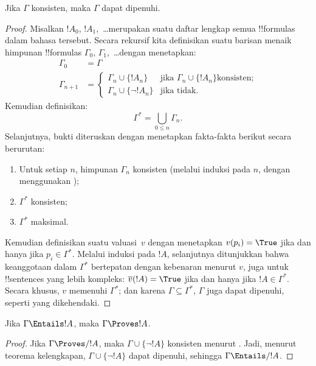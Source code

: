 \documentclass[../../../include/open-logic-section]{subfiles}
\begin{document}
\begin{thm}[Kelengkapan]
Jika $\Gamma$ konsisten, maka $\Gamma$ dapat dipenuhi.
\end{thm}

\begin{proof}
Misalkan $!A_0$, $!A_1$,~\dots merupakan suatu daftar lengkap semua
!!{formula}s dalam bahasa tersebut. Secara rekursif kita definisikan suatu
barisan menaik himpunan !!{formula}s $\Gamma_0$, $\Gamma_1$,~\dots dengan
menetapkan:
\begin{align*}
\Gamma_0 & = \Gamma\\
\Gamma_{n+1} &  =
\begin{cases}
  \Gamma_n \cup \{!A_n\} & \text{jika $\Gamma_n \cup \{!A_n\}$
    konsisten;}\\
  \Gamma_n \cup \{\lnot !A_n\} & \text{jika tidak}.
\end{cases}
\end{align*}
Kemudian definisikan:
\[
\Gamma^* = \bigcup_{0\le n}\Gamma_n.
\]
Selanjutnya, bukti diteruskan dengan menetapkan fakta-fakta berikut secara
berurutan:
\begin{enumerate}
\item Untuk setiap $n$, himpunan $\Gamma_n$ konsisten (melalui induksi pada
  $n$, dengan menggunakan );
\item $\Gamma^*$ konsisten;
\item $\Gamma^*$ maksimal.
\end{enumerate}
Kemudian definisikan suatu valuasi~$v$ dengan menetapkan $v(p_i) = \True$ jika
dan hanya jika $p_i \in \Gamma^*$. Melalui induksi pada $!A$, selanjutnya
ditunjukkan bahwa keanggotaan dalam $\Gamma^*$ bertepatan dengan kebenaran
menurut $v$, juga untuk !!{sentence}s yang lebih kompleks:
$\overline{v}(!A) = \True$ jika dan hanya jika $!A \in \Gamma^*$. Secara
khusus, $v$ memenuhi $\Gamma^*$; dan karena $\Gamma \subseteq \Gamma^*$,
$\Gamma$ juga dapat dipenuhi, seperti yang dikehendaki.
\end{proof}

\begin{cor}
Jika $\Gamma \Entails !A$, maka $\Gamma \Proves !A$.
\end{cor}

\begin{proof}
Jika $\Gamma\Proves/ !A$, maka $\Gamma \cup \{\lnot !A\}$ konsisten menurut
. Jadi, menurut teorema kelengkapan,
$\Gamma \cup \{\lnot !A\}$ dapat dipenuhi, sehingga $\Gamma \Entails/ !A$.
\end{proof}
\end{document}
